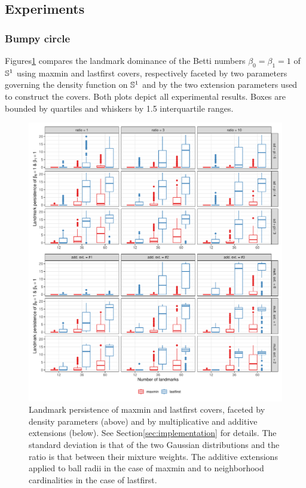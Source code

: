 \documentclass{article}
\begin{document}
\hypertarget{experiments-1}{%
\subsection{Experiments}\label{experiments-1}}

\label{sec:experiments}

\hypertarget{bumpy-circle-2}{%
\subsubsection{Bumpy circle}\label{bumpy-circle-2}}

Figures\nbs\ref{fig:bumpy-distribution} compares the landmark dominance
of the Betti numbers \(\beta_0 = \beta_1 = 1\) of \(\mathbb{S}^1\) using
maxmin and lastfirst covers, respectively faceted by two parameters
governing the density function on \(\mathbb{S}^1\) and by the two extension
parameters used to construct the covers. Both plots depict all
experimental results. Boxes are bounded by quartiles and whiskers by 1.5
interquartile ranges.

\begin{figure}
\includegraphics[width=\textwidth]{../figures/bumpy-persistence-distribution-extensions}
\caption{
Landmark persistence of maxmin and lastfirst covers, faceted by density parameters (above) and by multiplicative and additive extensions (below).
See Section\nbs\ref{sec:implementation} for details.
The standard deviation is that of the two Gaussian distributions and the ratio is that between their mixture weights.
The additive extensions applied to ball radii in the case of maxmin and to neighborhood cardinalities in the case of lastfirst.
\label{fig:bumpy-distribution}
}
\end{figure}
\end{document}
